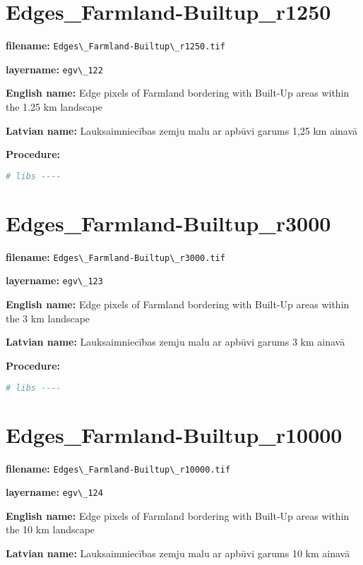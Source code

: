 \documentclass[
]{book}
\newcommand{\passthrough}[1]{#1}
\begin{document}
\section{Edges\_Farmland-Builtup\_r1250}\label{ch06.122}

\textbf{filename:} \passthrough{\lstinline!Edges\_Farmland-Builtup\_r1250.tif!}

\textbf{layername:} \passthrough{\lstinline!egv\_122!}

\textbf{English name:} Edge pixels of Farmland bordering with Built-Up areas within the 1.25 km landscape

\textbf{Latvian name:} Lauksaimniecības zemju malu ar apbūvi garums 1,25 km ainavā

\textbf{Procedure:}

\begin{lstlisting}[language=R]
# libs ----
\end{lstlisting}

\section{Edges\_Farmland-Builtup\_r3000}\label{ch06.123}

\textbf{filename:} \passthrough{\lstinline!Edges\_Farmland-Builtup\_r3000.tif!}

\textbf{layername:} \passthrough{\lstinline!egv\_123!}

\textbf{English name:} Edge pixels of Farmland bordering with Built-Up areas within the 3 km landscape

\textbf{Latvian name:} Lauksaimniecības zemju malu ar apbūvi garums 3 km ainavā

\textbf{Procedure:}

\begin{lstlisting}[language=R]
# libs ----
\end{lstlisting}

\section{Edges\_Farmland-Builtup\_r10000}\label{ch06.124}

\textbf{filename:} \passthrough{\lstinline!Edges\_Farmland-Builtup\_r10000.tif!}

\textbf{layername:} \passthrough{\lstinline!egv\_124!}

\textbf{English name:} Edge pixels of Farmland bordering with Built-Up areas within the 10 km landscape

\textbf{Latvian name:} Lauksaimniecības zemju malu ar apbūvi garums 10 km ainavā
\end{document}
